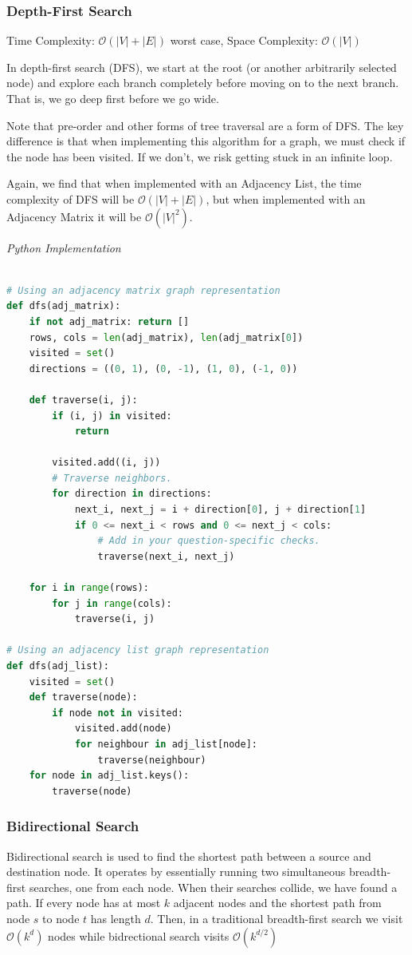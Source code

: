 \documentclass{article}
\newcommand{\bigO}{\mathcal{O}}
\begin{document}
    \subsubsection{Depth-First Search }
    Time Complexity: $\bigO(|V| + |E|)$ worst case, Space Complexity: $\bigO(|V|)$
    
    In depth-first search (DFS), we start at the root (or another arbitrarily selected node) and explore each branch completely before moving on to the next branch. That is, we go deep first before we go wide. 
    
    Note that pre-order and other forms of tree traversal are a form of DFS. The key difference is that when implementing this algorithm for a graph, we must check if the node has been visited. If we don't, we risk getting stuck in an infinite loop. 
    
    Again, we find that when implemented with an Adjacency List, the time complexity of DFS will be $\bigO(|V| + |E|)$, but when implemented with an Adjacency Matrix it will be $\bigO(|V|^2)$.
    
\vspace{8pt} \emph{Python Implementation}
\begin{lstlisting}[language=Python]

# Using an adjacency matrix graph representation
def dfs(adj_matrix):
    if not adj_matrix: return []
    rows, cols = len(adj_matrix), len(adj_matrix[0])
    visited = set()
    directions = ((0, 1), (0, -1), (1, 0), (-1, 0))

    def traverse(i, j):
        if (i, j) in visited:
            return

        visited.add((i, j))
        # Traverse neighbors.
        for direction in directions:
            next_i, next_j = i + direction[0], j + direction[1]
            if 0 <= next_i < rows and 0 <= next_j < cols:
                # Add in your question-specific checks.
                traverse(next_i, next_j)

    for i in range(rows):
        for j in range(cols):
            traverse(i, j)

# Using an adjacency list graph representation
def dfs(adj_list):
    visited = set()
    def traverse(node):
        if node not in visited:
            visited.add(node)
            for neighbour in adj_list[node]:
                traverse(neighbour)
    for node in adj_list.keys():
        traverse(node)
\end{lstlisting}

    \subsubsection{Bidirectional Search}
    Bidirectional search is used to find the shortest path between a source and destination node. It operates by essentially running two simultaneous breadth-first searches, one from each node. When their searches collide, we have found a path.  If every node has at most $k$ adjacent nodes and the shortest path from node $s$ to node $t$ has length $d$. Then, in a traditional breadth-first search we visit $\mathcal{O}(k^d)$ nodes while bidrectional search visits $\mathcal{O}(k^{d/2})$
\end{document}
